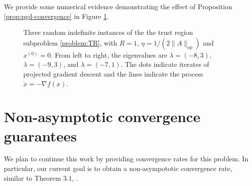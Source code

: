 \documentclass[11pt]{article}
\begin{document}
We provide some numerical evidence demonstrating the effect of Proposition \ref{prop:pgd-convergence} in
Figure \ref{fig:convergence-2D}.
\begin{figure}
    \centering
    \caption{Three random indefinite instances of the the trust region subproblem \eqref{problem:TR}, with $R = 1$, $\eta = 1/(2\|A\|_{\mathrm{op}})$ and
      $x^{(0)} = 0$. From left to right, the eigenvalues are $\lambda = (-8, 3)$, $\lambda = (-9, 3)$, and $\lambda = (-7,1)$.
      The dots indicate iterates of projected gradient descent and the lines indicate the process $\dot x = -\nabla f(x)$.}
    \label{fig:convergence-2D}
\end{figure}
\section{Non-asymptotic convergence guarantees}
We plan to continue this work by providing convergence rates for this problem. In particular, our current goal  is to obtain a non-asympototic convergence
rate, similar to Theorem 3.1, \cite{carmon2016}.

\end{document}
